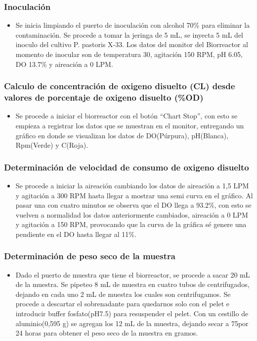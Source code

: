 \subsubsection{Inoculación}
\begin{itemize}
  \item Se inicia limpiando el puerto de inoculación con alcohol 70\% para eliminar la contaminación. Se procede a tomar la jeringa de 5 mL, se inyecta 5 mL del inoculo del cultivo P. pastoris X-33. Los datos del monitor del Biorreactor al momento de inocular son de temperatura 30\textdegree , agitación 150 RPM, pH 6.05, DO 13.7\% y aireación a 0 LPM.
\end{itemize}

\subsubsection{Calculo de concentración de oxigeno disuelto (CL) desde valores de porcentaje de oxigeno disuelto (\%OD)}
\begin{itemize}
  \item Se procede a iniciar el biorreactor con el botón “Chart Stop'', con esto se empieza a registrar los datos que se muestran en el monitor, entregando un gráfico en donde se visualizan los datos de DO(Púrpura), pH(Blanca), Rpm(Verde) y \textdegree C(Roja).
\end{itemize}

\subsubsection{Determinación de velocidad de consumo de oxigeno disuelto}

\begin{itemize}
  \item Se procede a iniciar la aireación cambiando los datos de aireación a 1,5 LPM y agitación a 300 RPM hasta llegar a mostrar una semi curva en el gráfico. Al pasar una con cuatro minutos se observa que el DO llega a 93.2\%, con esto se vuelven a normalidad los datos anteriormente cambiados, aireación a 0 LPM y agitación a 150 RPM, provocando que la curva de la gráfica sé genere una pendiente en el DO hasta llegar al 11\%.
\end{itemize}

\subsubsection{Determinación de peso seco de la muestra}
\begin{itemize}
  \item Dado el puerto de muestra que tiene el biorreactor, se procede a sacar 20 mL de la muestra. Se pipeteo 8 mL de muestra en cuatro tubos de centrifugados, dejando en cada uno 2 mL de muestra los cuales son centrifugamos. Se procede a descartar el sobrenadante para quedarnos solo con el pelet e introducir buffer fosfato(pH7.5) para resuspender el pelet. Con un cestillo de aluminio(0,595 g) se agregan los 12 mL de la muestra, dejando secar a 75\textdegree por 24 horas para obtener el peso seco de la muestra en gramos.
\end{itemize}
